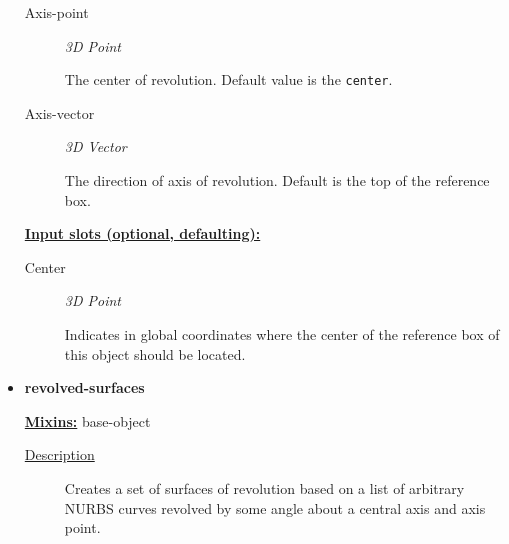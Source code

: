 \documentclass [11pt]{book}
\begin{document}
\begin{itemize}
\begin{description}
\item [Axis-point]
\emph{3D Point}

 The center of revolution. Default value is the \texttt{center}.




\item [Axis-vector]
\emph{3D Vector}

 The direction of axis of revolution. Default is the top of the reference box.




\end{description}






\textbf{
\underline{Input slots (optional, defaulting):}}

\begin{description}

\item [Center]
\emph{3D Point}

 Indicates in global coordinates where the center of the reference
box of this object should be located.




\end{description}







\item {}
\label{prim:revolved-surfaces}
\textbf{revolved-surfaces}


\textbf{
\underline{Mixins:}} base-object





\begin{description}

\item [
\underline{Description}]


Creates a set of surfaces of revolution based on a list of arbitrary NURBS curves revolved by some angle about
a central axis and axis point.



\end{description}




\begin{figure}
\begin{lrbox}{\boxedverb}
\begin{minipage}{\linewidth}
{\small

}
\end{minipage}
\end{lrbox}
\end{figure}
\end{itemize}
\end{document}
